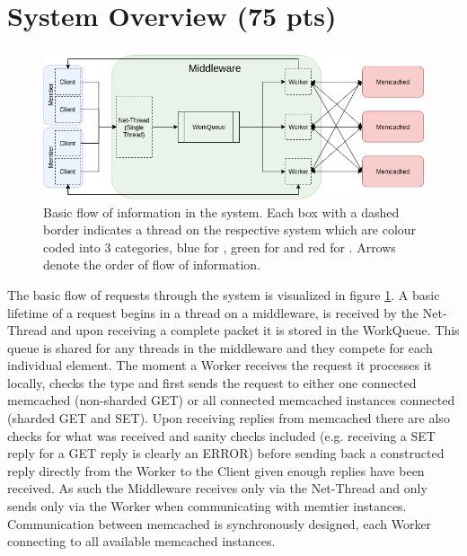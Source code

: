 \section{System Overview (75 pts)\label{sec:1}}

    \begin{figure}
        \includegraphics[width=0.8\linewidth]{graphics/system-request-flow.png}
        \caption{Basic flow of information in the system. Each box with a dashed border indicates a thread on the
                 respective system which are colour coded into 3 categories, blue for \cli, green for \mw{} and red for
                 \srv. Arrows denote the order of flow of information.\label{fig:request-overview}}
    \end{figure}

    The basic flow of requests through the system is visualized in figure \ref{fig:request-overview}. A basic lifetime
    of a request begins in a thread on a middleware, is received by the Net-Thread and upon receiving a complete packet
    it is stored in the WorkQueue. This queue is shared for any threads in the middleware and they compete for each
    individual element. The moment a Worker receives the request it processes it locally, checks the type and first
    sends the request to either one connected memcached (non-sharded GET) or all connected memcached instances connected
    (sharded GET and SET). Upon receiving replies from memcached there are also checks for what was received and sanity
    checks included (e.g. receiving a SET reply for a GET reply is clearly an ERROR) before sending back a constructed
    reply directly from the Worker to the Client given enough replies have been received. As such the Middleware
    receives only via the Net-Thread and only sends only via the Worker when communicating with memtier instances.
    Communication between memcached is synchronously designed, each Worker connecting to all available memcached
    instances.

